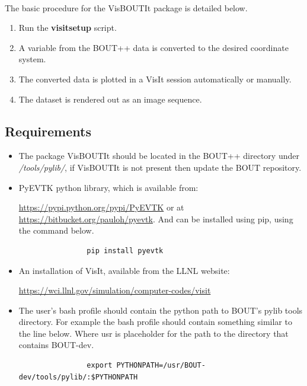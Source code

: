 \documentclass[12pt,a4paper]{article}
\begin{document}
	\paragraph{}
	The basic procedure for the VisBOUTIt package is detailed below.
	
	\begin{enumerate}
		\item{Run the \textbf{visitsetup} script.}
		\item{A variable from the BOUT++ data is converted to the desired coordinate system.}
		\item{The converted data is plotted in a VisIt session automatically or manually.}
		\item{The dataset is rendered out as an image sequence.}
	\end{enumerate}
	
	\subsection{Requirements}
		\begin{itemize}
		\item{The package VisBOUTIt should be located in the BOUT++ directory under \textit{/tools/pylib/}, if VisBOUTIt is not present then update the BOUT repository.}
		\item{PyEVTK python library, which is available from:
			
		\href{https://pypi.python.org/pypi/PyEVTK}{https://pypi.python.org/pypi/PyEVTK}
		or at \href{https://bitbucket.org/pauloh/pyevtk}{https://bitbucket.org/pauloh/pyevtk}. And can be installed using pip, using the command below.
			\begin{verbatim}
				pip install pyevtk
			\end{verbatim}
		
		}
		\item{An installation of VisIt, available from the LLNL website:
			
		\href{https://wci.llnl.gov/simulation/computer-codes/visit}{https://wci.llnl.gov/simulation/computer-codes/visit}}
		
		\item{The user's bash profile should contain the python path to BOUT's pylib tools directory. For example the bash profile should contain something similar to the line below. Where usr is placeholder for the path to the directory that contains BOUT-dev.
			\begin{verbatim}
				export PYTHONPATH=/usr/BOUT-dev/tools/pylib/:$PYTHONPATH
			\end{verbatim}
			
			}
		
		\end{itemize}
	
\end{document}
